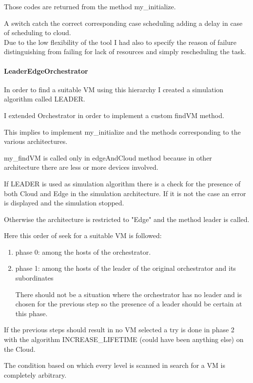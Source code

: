 \documentclass[12pt]{report}
\begin{document}
Those codes are returned from the method my\_initialize.

A switch catch the correct corresponding case scheduling  adding a delay in case of scheduling to cloud.\\
Due to the low flexibility of the tool I had also to specify the reason of failure distinguishing from failing for lack of resources and simply rescheduling the task.

\paragraph{LeaderEdgeOrchestrator} 
In order to find a suitable VM using this hierarchy I created a simulation algorithm called LEADER.

I extended Orchestrator in order to implement a custom findVM method.

This implies to implement my\_initialize and the methods corresponding to the various architectures.

my\_findVM is called only in edgeAndCloud method because in other architecture there are less or more devices involved.

If LEADER is used as simulation algorithm there is a check for the presence of both Cloud and Edge in the simulation architecture. If it is not the case an error is displayed and the simulation stopped.

Otherwise the architecture is restricted to "Edge" and the method leader is called.

Here this order of seek for a suitable VM is followed:
\begin{enumerate}
	\item phase 0: among the hosts of the orchestrator.
	\item phase 1: among the hosts of the leader of the original orchestrator and its subordinates
	
	There should not be a situation where the orchestrator has no leader and is chosen for the previous step so the presence of a leader should be certain at this phase.
\end{enumerate}

If the previous steps should result in no VM selected a try is done in phase 2 with the algorithm INCREASE\_LIFETIME (could have been anything else) on the Cloud.

The condition based on which every level is scanned in search for a VM is completely arbitrary.
\end{document}
